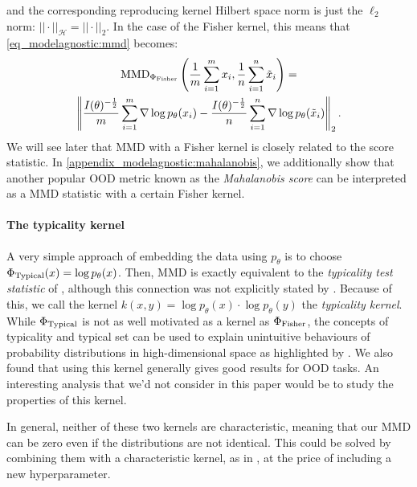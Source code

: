 {and the corresponding reproducing kernel Hilbert space norm is just the $\ell_2$ norm: $|| \cdot || _\mathcal{H} = || \cdot ||_2$. In the case of the Fisher kernel, this means that \cref{eq_modelagnostic:mmd} becomes:
\begin{multline}
    \label{eq_modelagnostic:mmd_fisher}
    \textup{MMD}_{\Phi_\textup{Fisher}}\left(\frac{1}{m} \sum_{i=1}^{m} x_i,\frac{1}{n}\sum_{i=1}^n \tilde{x}_i\right) = \\ \left\|\frac{I(\theta)^{-\frac{1}{2}}}{m} \sum_{i=1}^{m}  \nabla \log p_\theta (x_i) - \frac{I(\theta)^{-\frac{1}{2}}}{n}  \sum_{i=1}^{n}  \nabla \log p_\theta (\tilde{x}_i)\right\|_2.
\end{multline}
We will see later that MMD with a Fisher kernel is closely related to the score statistic. In \cref{appendix_modelagnostic:mahalanobis}, we additionally show that another popular OOD metric known as the \emph{Mahalanobis score} \parencite{lee_simple_2018} can be interpreted as a MMD statistic with a certain Fisher kernel.




\paragraph{The typicality kernel} A very simple approach of embedding the data using $p_\theta$ is to choose $\Phi_\textup{Typical}(x) = \log p_\theta (x)$. Then, MMD is exactly equivalent to the \emph{typicality test statistic} of \textcite{nalisnick_detecting_2019}, although this connection was not explicitly stated  by \textcite{nalisnick_detecting_2019}. Because of this, we call the kernel $k(x,y) = \log p_\theta (x) \cdot \log p_\theta (y)$ the \emph{typicality kernel}.  %
While $\Phi_\textup{Typical}$ is not as well motivated as a kernel as $\Phi_\textup{Fisher}$, the concepts of typicality and typical set can be used to explain unintuitive behaviours of probability distributions in high-dimensional space as highlighted by \textcite{nalisnick_deep_2019}. We also found that using this kernel generally gives good results for OOD tasks. An interesting analysis that we'd not consider in this paper would be to study the properties of this kernel.



In general, neither of these two kernels are characteristic, meaning that our MMD can be zero even if the distributions are not identical. This could be solved by combining them with a characteristic kernel, as in \textcite{liu_learning_2020}, at the price of including a new hyperparameter.


}
